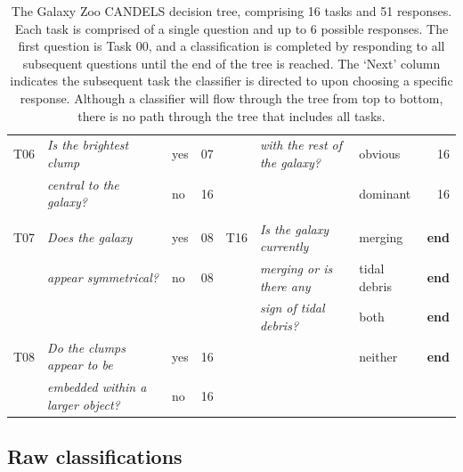\documentclass[useAMS,usenatbib]{mn2e}
\begin{document}
{\begin{table}
\begin{tabular}{@{}cllr|cllr}
T06  & {\it Is the brightest clump            } & yes               & 07         &       & {\it with the rest of the galaxy?  }  & obvious          & 16 \\
     & {\it central to the galaxy?            } & no                & 16         &       & {\it                               }  & dominant         & 16 \\
     &                                          &                   &            &       &                                       &                  &    \\ 
T07  & {\it Does the galaxy                   } & yes               & 08         &  T16  & {\it Is the galaxy currently       }  & merging          & {\bf end}  \\
     & {\it appear symmetrical?               } & no                & 08         &       & {\it merging or is there any       }  & tidal debris     & {\bf end}  \\
     &                                          &                   &            &       & {\it sign of tidal debris?         }  & both             & {\bf end}  \\
T08  & {\it Do the clumps appear to be        } & yes               & 16         &       & {\it                               }  & neither          & {\bf end}  \\
     & {\it embedded within a larger object?  } & no                & 16         &       &                                       &                  &    \\
 \end{tabular}
 \caption{The Galaxy Zoo CANDELS decision tree, comprising 16 tasks and 51 responses. Each task is comprised of a single question and up to 6 possible responses. The first question is Task 00, and a classification is completed by responding to all subsequent questions until the end of the tree is reached. The `Next' column indicates the subsequent task the classifier is directed to upon choosing a specific response. Although a classifier will flow through the tree from top to bottom, there is no path through the tree that includes all tasks. 
\label{table:tree}}
\end{table}



\subsection{Raw classifications}\label{sec:rawclass}

}
\end{document}
